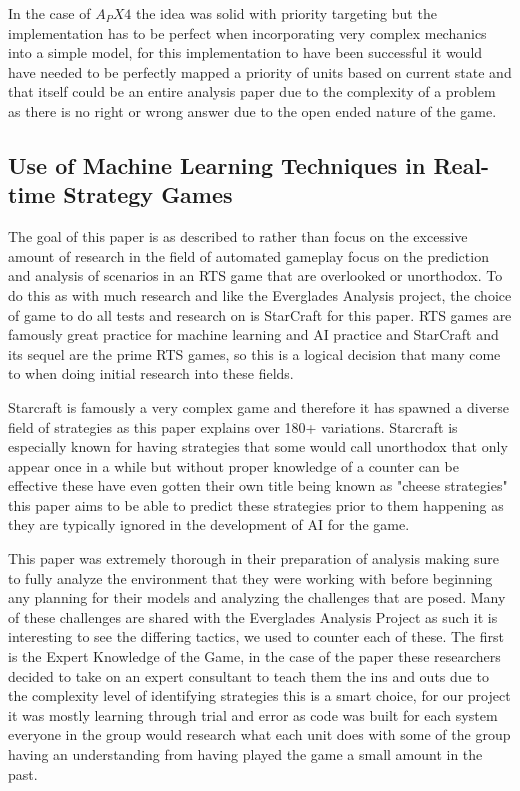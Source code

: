 \documentclass[a4paper,12pt]{report}
\begin{document}
In the case of $A_PX4$ the idea was solid with priority targeting but the implementation has to be perfect when incorporating very complex mechanics into a simple model, for this implementation to have been successful it would have needed to be perfectly mapped a priority of units based on current state and that itself could be an entire analysis paper due to the complexity of a problem as there is no right or wrong answer due to the open ended nature of the game.

\subsection{Use of Machine Learning Techniques in Real-time Strategy Games}

The goal of this paper is as described to rather than focus on the excessive amount of research in the field of automated gameplay focus on the prediction and analysis of scenarios in an RTS game that are overlooked or unorthodox. To do this as with much research and like the Everglades Analysis project, the choice of game to do all tests and research on is StarCraft for this paper. RTS games are famously great practice for machine learning and AI practice and StarCraft and its sequel are the prime RTS games, so this is a logical decision that many come to when doing initial research into these fields.

Starcraft is famously a very complex game and therefore it has spawned a diverse field of strategies as this paper explains over 180+ variations. Starcraft is especially known for having strategies that some would call unorthodox that only appear once in a while but without proper knowledge of a counter can be effective these have even gotten their own title being known as "cheese strategies" this paper aims to be able to predict these strategies prior to them happening as they are typically ignored in the development of AI for the game.
        	
This paper was extremely thorough in their preparation of analysis making sure to fully analyze the environment that they were working with before beginning any planning for their models and analyzing the challenges that are posed. Many of these challenges are shared with the Everglades Analysis Project as such it is interesting to see the differing tactics, we used to counter each of these. The first is the Expert Knowledge of the Game, in the case of the paper these researchers decided to take on an expert consultant to teach them the ins and outs due to the complexity level of identifying strategies this is a smart choice, for our project it was mostly learning through trial and error as code was built for each system everyone in the group would research what each unit does with some of the group having an understanding from having played the game a small amount in the past.
\end{document}
